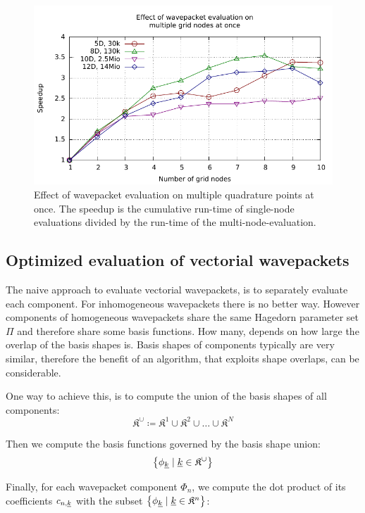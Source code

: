 \documentclass{article}
\begin{document}
\begin{figure}[H]
  \centering
  \includegraphics[width=1.0\textwidth]{plots/hawp_eval_multiqp}
  \caption{
    Effect of wavepacket evaluation on multiple quadrature points at once.
    The speedup is the cumulative run-time of single-node evaluations divided by
    the run-time of the multi-node-evaluation.
  }
  \label{fig:hawp_eval_multiqp}
\end{figure}

\subsection{Optimized evaluation of vectorial wavepackets} \label{sec:vector_hawp_eval}
The naive approach to evaluate vectorial wavepackets, is to separately
evaluate each component. For inhomogeneous wavepackets there is
no better way.
However components of homogeneous wavepackets share the same Hagedorn parameter set \(\Pi\)
and therefore share some basis functions. How many, depends on how large the overlap of
the basis shapes is. Basis shapes of components typically are very similar, therefore
the benefit of an algorithm, that exploits shape overlaps, can be considerable.

One way to achieve this, is to compute the union of the
basis shapes of all components:
\[
\mathfrak{K}^{\cup} \coloneqq  \mathfrak{K}^1 \cup \mathfrak{K}^2 \cup \dots \cup \mathfrak{K}^N
\]

Then we compute the basis functions governed by the basis shape union:
\[
\left\{\phi_{\underline{k}} \;|\;\underline{k} \in \mathfrak{K}^{\cup}\right\}
\]

Finally, for each wavepacket component \(\Phi_n\),
we compute the dot product of its coefficients \(c_{n,\underline{k}}\)
with the subset \(\left\{\phi_{\underline{k}}\;|\; \underline{k} \in \mathfrak{K}^n\right\}\):
\end{document}
